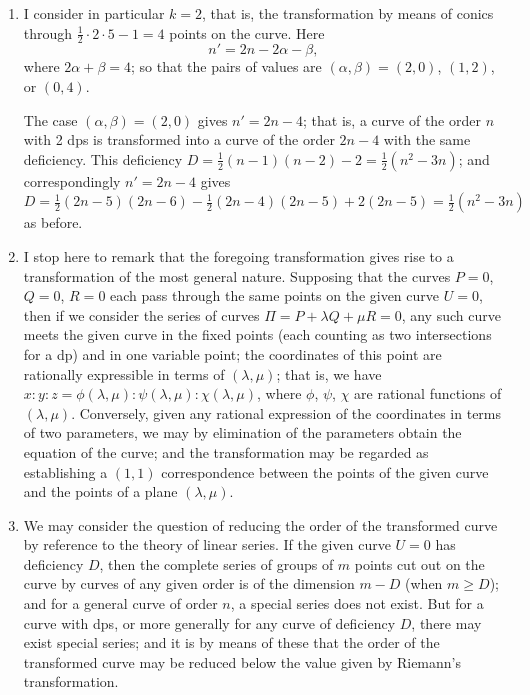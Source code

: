 \documentclass[12pt,a4paper]{article}
\theoremstyle{plain}
\theoremstyle{definition}
\theoremstyle{remark}
\begin{document}
\begin{enumerate}[label=\arabic*.]
But we must have $n' > n$ (for otherwise the transformation is illusory, the transformed curve being transformable into the original curve by a transformation of the same or a lower order); and hence we must have
\[kn - \frac{1}{2}k(k+3) + 1 > n,\]
or, what is the same thing,
\[(k-1)(n - \frac{1}{2}k - 2) > 1,\]
which implies $k \geq 2$, $n \geq \frac{1}{2}k + 3$; that is, $n \geq 4$ for $k = 2$, and $n \geq 5$ for $k = 3$, etc.

\item I consider in particular $k = 2$, that is, the transformation by means of conics through $\frac{1}{2} \cdot 2 \cdot 5 - 1 = 4$ points on the curve. Here
\[n' = 2n - 2\alpha - \beta,\]
where $2\alpha + \beta = 4$; so that the pairs of values are $(\alpha, \beta) = (2, 0)$, $(1, 2)$, or $(0, 4)$.

The case $(\alpha, \beta) = (2, 0)$ gives $n' = 2n - 4$; that is, a curve of the order $n$ with 2 dps is transformed into a curve of the order $2n - 4$ with the same deficiency. This deficiency $D = \frac{1}{2}(n-1)(n-2) - 2 = \frac{1}{2}(n^2 - 3n)$; and correspondingly $n' = 2n - 4$ gives $D = \frac{1}{2}(2n-5)(2n-6) - \frac{1}{2}(2n-4)(2n-5) + 2(2n-5) = \frac{1}{2}(n^2 - 3n)$ as before.

\item I stop here to remark that the foregoing transformation gives rise to a transformation of the most general nature. Supposing that the curves $P = 0$, $Q = 0$, $R = 0$ each pass through the same points on the given curve $U = 0$, then if we consider the series of curves $\Pi = P + \lambda Q + \mu R = 0$, any such curve meets the given curve in the fixed points (each counting as two intersections for a dp) and in one variable point; the coordinates of this point are rationally expressible in terms of $(\lambda, \mu)$; that is, we have $x:y:z = \phi(\lambda, \mu):\psi(\lambda, \mu):\chi(\lambda, \mu)$, where $\phi$, $\psi$, $\chi$ are rational functions of $(\lambda, \mu)$. Conversely, given any rational expression of the coordinates in terms of two parameters, we may by elimination of the parameters obtain the equation of the curve; and the transformation may be regarded as establishing a $(1,1)$ correspondence between the points of the given curve and the points of a plane $(\lambda, \mu)$.

\item We may consider the question of reducing the order of the transformed curve by reference to the theory of linear series. If the given curve $U = 0$ has deficiency $D$, then the complete series of groups of $m$ points cut out on the curve by curves of any given order is of the dimension $m - D$ (when $m \geq D$); and for a general curve of order $n$, a special series does not exist. But for a curve with dps, or more generally for any curve of deficiency $D$, there may exist special series; and it is by means of these that the order of the transformed curve may be reduced below the value given by Riemann's transformation.


\end{enumerate}
\end{document}
